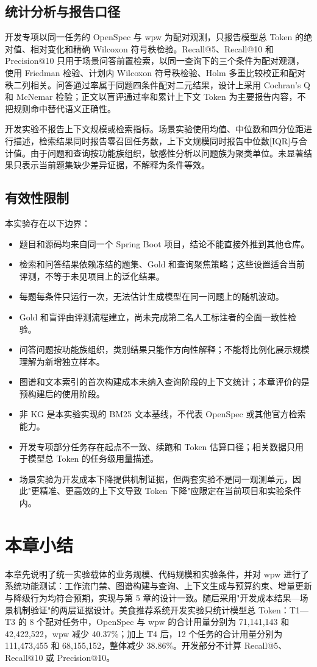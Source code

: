 \subsection{统计分析与报告口径}
开发专项以同一任务的 OpenSpec 与 wpw 为配对观测，只报告模型总 Token 的绝对值、相对变化和精确 Wilcoxon 符号秩检验。Recall@5、Recall@10 和 Precision@10 只用于场景问答前置检索，以同一查询下的三个条件为配对观测，使用 Friedman 检验、计划内 Wilcoxon 符号秩检验、Holm 多重比较校正和配对秩二列相关。问答通过率属于同题四条件配对二元结果，设计上采用 Cochran's Q 和 McNemar 检验；正文以盲评通过率和累计上下文 Token 为主要报告内容，不把规则命中替代语义正确性。

开发实验不报告上下文规模或检索指标。场景实验使用均值、中位数和四分位距进行描述，检索结果同时报告零召回任务数，上下文规模同时报告中位数[IQR]与合计值。由于问题和查询按功能族组织，敏感性分析以问题族为聚类单位。未显著结果只表示当前题集缺少差异证据，不解释为条件等效。


\subsection{有效性限制}
本实验存在以下边界：

\begin{itemize}
\item 题目和源码均来自同一个 Spring Boot 项目，结论不能直接外推到其他仓库。
\item 检索和问答结果依赖冻结的题集、Gold 和查询聚焦策略；这些设置适合当前评测，不等于未见项目上的泛化结果。
\item 每题每条件只运行一次，无法估计生成模型在同一问题上的随机波动。
\item Gold 和盲评由评测流程建立，尚未完成第二名人工标注者的全面一致性检验。
\item 问答问题按功能族组织，类别结果只能作方向性解释；不能将比例化展示规模理解为新增独立样本。
\item 图谱和文本索引的首次构建成本未纳入查询阶段的上下文统计；本章评价的是预构建后的使用阶段。
\item 非 KG 是本实验实现的 BM25 文本基线，不代表 OpenSpec 或其他官方检索能力。
\item 开发专项部分任务存在起点不一致、续跑和 Token 估算口径；相关数据只用于模型总 Token 的任务级用量描述。
\item 场景实验为开发成本下降提供机制证据，但两套实验不是同一观测单元，因此"更精准、更高效的上下文导致 Token 下降"应限定在当前项目和实验条件内。
\end{itemize}

\section{本章小结}
本章先说明了统一实验载体的业务规模、代码规模和实验条件，并对 wpw 进行了系统功能测试：工作流门禁、图谱构建与查询、上下文生成与预算约束、增量更新与降级行为均符合预期，实现与第 5 章的设计一致。随后采用"开发成本结果—场景机制验证"的两层证据设计。美食推荐系统开发实验只统计模型总 Token：T1—T3 的 8 个配对任务中，OpenSpec 与 wpw 的合计用量分别为 71,141,143 和 42,422,522，wpw 减少 40.37\%；加上 T4 后，12 个任务的合计用量分别为 111,473,455 和 68,155,152，整体减少 38.86\%。开发部分不计算 Recall@5、Recall@10 或 Precision@10。

